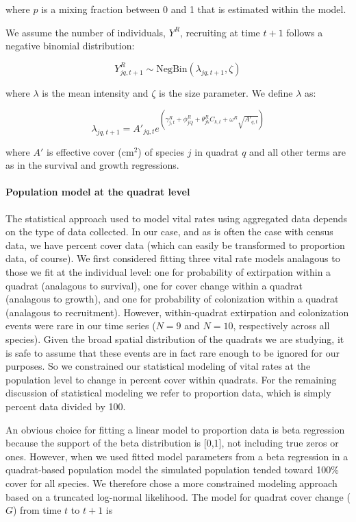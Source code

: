 \documentclass[12pt,]{article}
\begin{document}
where \(p\) is a mixing fraction between 0 and 1 that is estimated
within the model.

We assume the number of individuals, \(Y^{R}\), recruiting at time
\(t+1\) follows a negative binomial distribution:

\begin{equation}
Y^{R}_{jq,t+1} \sim \text{NegBin}(\lambda_{jq,t+1},\zeta)
\end{equation}

where \(\lambda\) is the mean intensity and \(\zeta\) is the size
parameter. We define \(\lambda\) as:

\begin{equation}
\lambda_{jq,t+1} = A'_{jq,t}e^{(\gamma^{R}_{j,t} + \phi^{R}_{jQ} + \theta^{R}_{jk}C_{k,t} + \omega^{R}\sqrt{A'_{q,t}})}
\end{equation}

where \(A'\) is effective cover (\(\text{cm}^2\)) of species \(j\) in
quadrat \(q\) and all other terms are as in the survival and growth
regressions.

\paragraph{Population model at the quadrat
level}\label{population-model-at-the-quadrat-level}

The statistical approach used to model vital rates using aggregated data
depends on the type of data collected. In our case, and as is often the
case with census data, we have percent cover data (which can easily be
transformed to proportion data, of course). We first considered fitting
three vital rate models analagous to those we fit at the individual
level: one for probability of extirpation within a quadrat (analagous to
survival), one for cover change within a quadrat (analagous to growth),
and one for probability of colonization within a quadrat (analagous to
recruitment). However, within-quadrat extirpation and colonization
events were rare in our time series (\(N=9\) and \(N=10\), respectively
across all species). Given the broad spatial distribution of the
quadrats we are studying, it is safe to assume that these events are in
fact rare enough to be ignored for our purposes. So we constrained our
statistical modeling of vital rates at the population level to change in
percent cover within quadrats. For the remaining discussion of
statistical modeling we refer to proportion data, which is simply
percent data divided by 100.

An obvious choice for fitting a linear model to proportion data is beta
regression because the support of the beta distribution is {[}0,1{]},
not including true zeros or ones. However, when we used fitted model
parameters from a beta regression in a quadrat-based population model
the simulated population tended toward 100\% cover for all species. We
therefore chose a more constrained modeling approach based on a
truncated log-normal likelihood. The model for quadrat cover change
(\(G\)) from time \(t\) to \(t+1\) is
\end{document}
